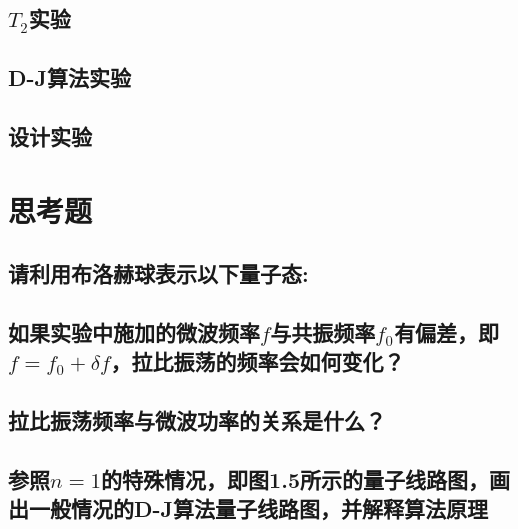 \documentclass[a4paper]{article}
\begin{document}
\subsection{$ T_2 $实验}
\subsection{D-J算法实验}
\subsection{设计实验}






\section{思考题}
\subsection*{请利用布洛赫球表示以下量子态:}

\subsection*{如果实验中施加的微波频率$ f $与共振频率$ f_0 $有偏差，即$ f = f_0 + \delta f $，拉比振荡的频率会如何变化？}

\subsection*{拉比振荡频率与微波功率的关系是什么？}

\subsection*{参照$ n=1 $的特殊情况，即图1.5所示的量子线路图，画出一般情况的D-J算法量子线路图，并解释算法原理}



\end{document}
